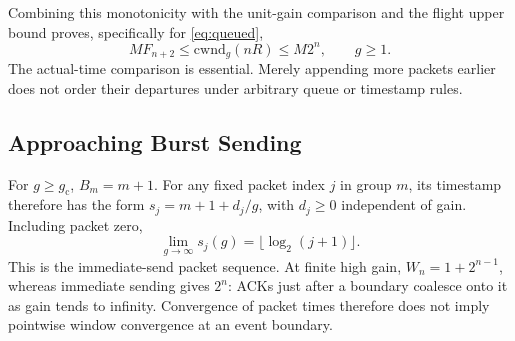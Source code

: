 \documentclass[sigconf,nonacm]{acmart}
\newcommand{\gc}{g_{\mathrm c}}
\newcommand{\cwnd}{\mathrm{cwnd}}
\begin{document}
Combining this monotonicity with the unit-gain comparison and the flight upper bound proves, specifically for \eqref{eq:queued},
\begin{equation}
 M F_{n+2}\le\cwnd_g(nR)\le M2^n,\qquad g\ge1.
\end{equation}
The actual-time comparison is essential. Merely appending more packets earlier does not order their departures under arbitrary queue or timestamp rules.

\subsection{Approaching Burst Sending}
For $g\ge\gc$, $B_m=m+1$. For any fixed packet index $j$ in group $m$, its timestamp therefore has the form $s_j=m+1+d_j/g$, with $d_j\ge0$ independent of gain. Including packet zero,
\begin{equation}
 \lim_{g\to\infty}s_j(g)=\lfloor\log_2(j+1)\rfloor.
\end{equation}
This is the immediate-send packet sequence. At finite high gain,
$W_n=1+2^{n-1}$, whereas immediate sending gives $2^n$: ACKs just after
a boundary coalesce onto it as gain tends to infinity. Convergence of
packet times therefore does not imply pointwise window convergence at
an event boundary.
\end{document}
